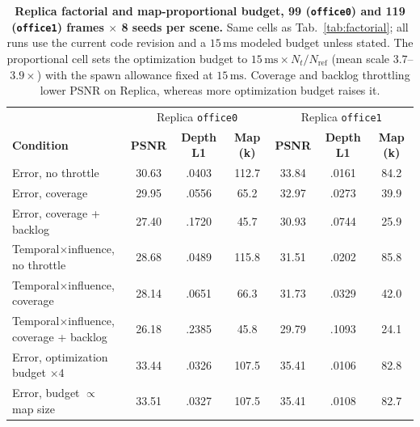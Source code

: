 \begin{table}[t]
\centering
\footnotesize\setlength{\tabcolsep}{4pt}
\begin{tabular}{lcccccc}
\toprule
& \multicolumn{3}{c}{Replica \texttt{office0}} & \multicolumn{3}{c}{Replica \texttt{office1}} \\
\textbf{Condition} & \textbf{PSNR} & \textbf{Depth L1} & \textbf{Map (k)} & \textbf{PSNR} & \textbf{Depth L1} & \textbf{Map (k)} \\
\midrule
Error, no throttle & 30.63 & .0403 & 112.7 & 33.84 & .0161 & 84.2 \\
Error, coverage & 29.95 & .0556 & 65.2 & 32.97 & .0273 & 39.9 \\
Error, coverage + backlog & 27.40 & .1720 & 45.7 & 30.93 & .0744 & 25.9 \\
Temporal$\times$influence, no throttle & 28.68 & .0489 & 115.8 & 31.51 & .0202 & 85.8 \\
Temporal$\times$influence, coverage & 28.14 & .0651 & 66.3 & 31.73 & .0329 & 42.0 \\
Temporal$\times$influence, coverage + backlog & 26.18 & .2385 & 45.8 & 29.79 & .1093 & 24.1 \\
\midrule
Error, optimization budget $\times4$ & 33.44 & .0326 & 107.5 & 35.41 & .0106 & 82.8 \\
Error, budget $\propto$ map size & 33.51 & .0327 & 107.5 & 35.41 & .0108 & 82.7 \\
\bottomrule
\end{tabular}
\caption{\textbf{Replica factorial and map-proportional budget, 99 (\texttt{office0}) and 119 (\texttt{office1}) frames $\times$ 8 seeds per scene.} Same cells as Tab.~\ref{tab:factorial}; all runs use the current code revision and a $15\,\mathrm{ms}$ modeled budget unless stated. The proportional cell sets the optimization budget to $15\,\mathrm{ms}\times N_t/N_{\mathrm{ref}}$ (mean scale $3.7$--$3.9\times$) with the spawn allowance fixed at $15\,\mathrm{ms}$. Coverage and backlog throttling lower PSNR on Replica, whereas more optimization budget raises it.}
\label{tab:replica}
\end{table}
